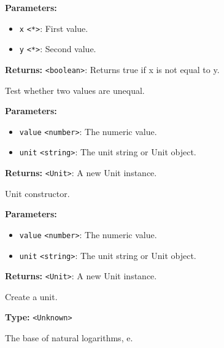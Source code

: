 \documentclass[12pt,a4paper]{article}
\begin{document}
\noindent \textbf{Parameters:}
\begin{itemize}
  \item \texttt{x} \texttt{<*>}: First value.
  \item \texttt{y} \texttt{<*>}: Second value.
\end{itemize}

\noindent \textbf{Returns:} \texttt{<boolean>}: Returns true if x is not equal to y.

\noindent Test whether two values are unequal.

\vspace{5mm}
\noindent {}


\noindent \textbf{Parameters:}
\begin{itemize}
  \item \texttt{value} \texttt{<number>}: The numeric value.
  \item \texttt{unit} \texttt{<string>}: The unit string or Unit object.
\end{itemize}

\noindent \textbf{Returns:} \texttt{<Unit>}: A new Unit instance.

\noindent Unit constructor.

\vspace{5mm}
\noindent {}


\noindent \textbf{Parameters:}
\begin{itemize}
  \item \texttt{value} \texttt{<number>}: The numeric value.
  \item \texttt{unit} \texttt{<string>}: The unit string or Unit object.
\end{itemize}

\noindent \textbf{Returns:} \texttt{<Unit>}: A new Unit instance.

\noindent Create a unit.

\vspace{5mm}
\noindent {}\vspace{4mm}


\noindent \textbf{Type:} \texttt{<Unknown>}

\noindent The base of natural logarithms, e.
\end{document}
